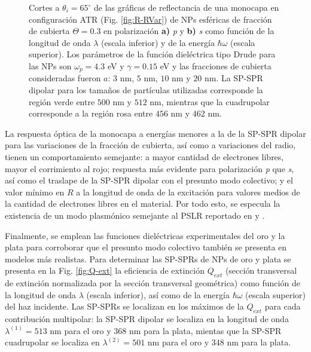 \begin{figure}[h!]
	\caption{Cortes a $\theta_i = 65^\circ$ de las gráficas de reflectancia de una monocapa en configuración ATR (Fig. \ref{fig:R-RVar}) de NPs esféricas de fracción de cubierta $\Theta = 0.3$ en polarización \textbf{a)} \emph{p} y \textbf{b)} \emph{s} como función de la longitud de onda $\lambda$ (escala inferior) y de la energía $\hbar\omega$ (escala superior). Los parámetros de la función dieléctrica tipo Drude para las NPs son $\omega_p = 4.3$ eV y $\gamma = 0.15$ eV y las fracciones de cubierta consideradas fueron $a$: $3$ nm, $5$ nm, $10$ nm y $20$ nm. La SP-SPR dipolar para los tamaños de partículas utilizadas corresponde la región verde entre $500$ nm y $512$ nm, mientras que la cuadrupolar corresponde a la región rosa entre $456$ nm y $462$ nm.}\label{fig:R-RVar-Cuts}
	\end{figure}	


La respuesta óptica de la monocapa a energías menores a la de la SP-SPR dipolar para las variaciones de la fracción de cubierta, así como a variaciones del radio, tienen un comportamiento semejante: a mayor cantidad de electrones libres, mayor el corrimiento al rojo; respuesta más evidente para polarización \emph{p} que \emph{s}, así como el traslape  de la SP-SPR dipolar con el presunto modo colectivo; y el valor mínimo en $R$ a la longitud de onda de la excitación para valores medios de la cantidad de electrones libres en el material. Por todo esto, se especula la existencia de un modo plasmónico semejante al PSLR reportado en  \cite{kabashin2009plasmonic} y \cite{danilov2018ultra}. 

Finalmente, se emplean las funciones dieléctricas experimentales del oro y la plata \cite{johnson1972constants} para corroborar que el presunto modo colectivo también se presenta en modelos más realistas. Para determinar las SP-SPRs de NPs de oro y plata se presenta en la Fig. \ref{fig:Q-ext} la eficiencia de extinción $Q_{ext}$ (sección transversal de extinción normalizada por la sección transversal geométrica) como función de la longitud de onda $\lambda$ (escala inferior), así como de la energía $\hbar\omega$ (escala superior) del haz incidente. Las SP-SPRs se localizan en los máximos de la $Q_{ext}$ para cada contribución multipolar: la SP-SPR dipolar se localiza en  la longitud de onda $\lambda^{(1)} = 513$ nm para el oro y $368$ nm para la plata, mientas que la SP-SPR cuadrupolar se localiza en $\lambda^{(2)} = 501$ nm para el oro y $348$ nm para la plata. %


